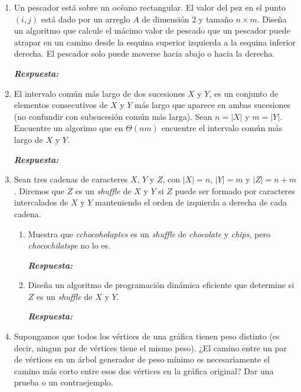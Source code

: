 \documentclass[11pt,letterpaper]{article}
\newcommand\respuesta{\textbf{\textit{Respuesta: }}}
\begin{document}
\begin{enumerate}[leftmargin=*]
\begin{enumerate}[label=\alph*)]
        \respuesta
    \end{enumerate}

    \item Un pescador está sobre un océano rectangular. El valor del pez en el punto $(i, j)$ está dado por un arreglo $A$ de dimensión 2 y tamaño $n \times m$.
    Diseña un algoritmo que calcule el mácimo valor de pescado que un pescador puede atrapar en un camino desde la esquina superior izquierda a la esquina inferior derecha.
    El pescador solo puede moverse hacia abajo o hacia la derecha.

    \respuesta

    \item El intervalo común más largo de dos sucesiones $X$ y $Y$, es un conjunto de elementos consecutivos de $X$ y $Y$ más largo que aparece en ambas sucesiones (no confundir con subsucesión común más larga).
    Sean $n = |X|$ y $m = |Y|$. Encuentre un algorimo que en $\Theta (nm)$ encuentre el intervalo común más largo de $X$ y $Y$.

    \respuesta

    \item Sean tres cadenas de caracteres $X$, $Y$ y $Z$, con $|X| = n$, $|Y| = m$ y $|Z| = n + m$.
    Diremos que $Z$ es un \textit{shuffle} de $X$ y $Y$ si $Z$ puede ser formado por caracteres intercalados de $X$ y $Y$ manteniendo el orden de izquierda a derecha de cada cadena.

    \begin{enumerate}[label=\alph*)]
        \item Muestra que \textit{cchocoholaptes} es un \textit{shuffle} de \textit{chocolate} y \textit{chips}, pero \textit{chocochilatspe} no lo es.
        
        \respuesta

        \item Diseña un algoritmo de programación dinámica eficiente que determine si $Z$ es un \textit{shuffle} de $X$ y $Y$.
        
        \respuesta
    \end{enumerate}

    \item Supongamos que todos los vértices de una gráfica tienen peso distinto (es decir, ningun par de vértices tiene el mismo peso).
    ¿El camino entre un par de vértices en un árbol generador de peso mínimo es necesariamente el camino más corto entre esos dos vértices en la gráfica original?
    Dar una prueba o un contraejemplo.


\end{enumerate}
\end{document}
